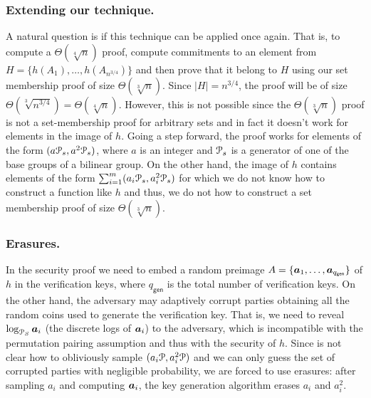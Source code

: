 
\subsubsection{Extending our technique.}
A natural question is if this technique can be applied once again. That is, to compute a $\Theta(\sqrt[4]{n})$  proof, compute commitments to an element from $H=\{h(A_1),\ldots,h(A_{n^{3/4}})\}$
and then prove that it belong to $H$ using our set membership proof of size $\Theta(\sqrt[3]{n})$. Since $|H|=n^{3/4}$, the proof will be of size $\Theta(\sqrt[3]{n^{3/4}})=\Theta(\sqrt[4]{n})$. However, this is not possible since the $\Theta(\sqrt[3]{n})$ proof is not a set-membership proof for arbitrary sets and in fact it doesn't work for elements in the image of $h$. Going a step forward, the proof works for elements of the form $(a\mathcal{P}_s,a^2\mathcal{P}_s)$, where $a$ is an integer and $\mathcal{P}_s$ is a generator of one of the base groups of a bilinear group. On the other hand, the image of $h$ contains elements of the form $\sum_{i=1}^m (a_i\mathcal{P}_s,a_i^2\mathcal{P}_s)$ for which we do not know how to construct a function like $h$ and thus, we do not how to construct a set membership proof of size $\Theta(\sqrt[3]{n})$.


\subsubsection{Erasures.}
In the security proof we need to embed a random preimage $A=\{{\boldsymbol{a}}_1,\ldots,\allowbreak {\boldsymbol{a}}_{q_{\mathsf{gen}}}\}$ of $h$ in the verification keys, where $q_{\mathsf{gen}}$ is the total number of verification keys. On the other hand, the adversary may adaptively corrupt parties obtaining all the random coins used to generate the verification key. That is, we need to reveal $\log_{\mathcal{P}_S} {\boldsymbol{a}}_i$ (the discrete logs of ${\boldsymbol{a}}_i$) to the adversary, which is incompatible with the permutation pairing assumption and thus with the security of $h$. Since is not clear how to obliviously sample $(a_i\mathcal{P},a^2_i\mathcal{P})$ and we can only guess the set of corrupted parties with negligible probability, we are forced to use erasures: after sampling $a_i$ and computing ${\boldsymbol{a}}_i$, the key generation algorithm erases $a_i$ and $a_i^2$.

